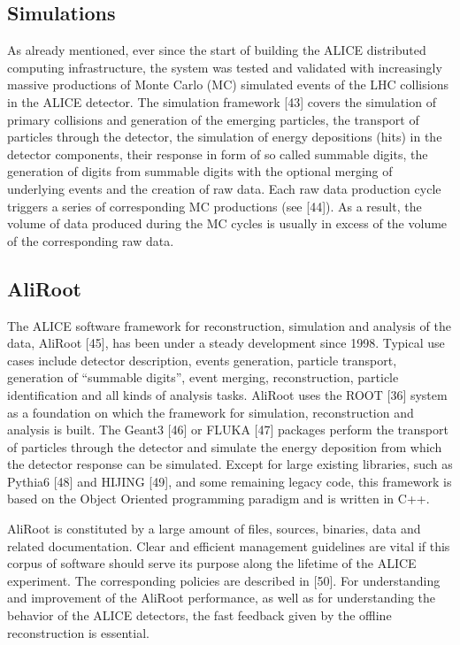 \documentclass{intech}
\begin{document}
\subsection{Simulations}
%
As already mentioned, ever since the start of building the ALICE
distributed computing infrastructure, the system was tested and
validated with increasingly massive productions  of Monte Carlo (MC)
simulated events of the LHC collisions in the ALICE detector. The
simulation framework [43] covers the simulation of primary collisions
and generation of the emerging particles, the transport of particles
through the detector, the simulation of energy depositions (hits) in
the detector components, their response in form of so called
summable digits, the generation of digits from summable digits with
the optional merging of underlying events and the creation of raw
data. Each raw data production cycle triggers a series of
corresponding MC productions (see [44]). As a result, the volume of
data produced during the MC cycles is usually in excess of the
volume of the corresponding raw data.

\subsection{AliRoot}
%
The ALICE software framework for reconstruction, simulation and
analysis of the data, AliRoot [45], has been under a steady
development since 1998. Typical use cases include detector
description, events generation, particle transport, generation of
``summable digits'', event merging, reconstruction, particle
identification and all kinds of analysis tasks. AliRoot uses the
ROOT [36] system as a foundation on which the framework for
simulation, reconstruction and analysis is built. The Geant3 [46] or
FLUKA [47] packages perform the transport of particles through the
detector and simulate the energy deposition from which the detector
response can be simulated. Except for large existing libraries, such
as Pythia6 [48] and HIJING [49], and some remaining legacy code,
this framework is based on the Object Oriented programming paradigm
and is written in C++.

AliRoot is constituted by a large amount of files, sources,
binaries, data and related documentation. Clear and efficient
management guidelines are vital if this corpus of software should
serve its purpose along the lifetime of the ALICE experiment. The
corresponding policies are described in [50].  For understanding and
improvement of the AliRoot performance, as well as for understanding
the behavior of the ALICE detectors, the fast feedback given by the
offline reconstruction is essential.
\end{document}
